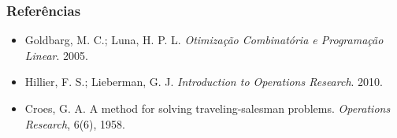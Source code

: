 \documentclass[fleqn]{beamer}
\begin{document}
\begin{frame}
	\frametitle{Referências}
	\begin{itemize}
		\item Goldbarg, M. C.; Luna, H. P. L. \textit{Otimização
			Combinatória e Programação Linear}. 2005.
		\item Hillier, F. S.; Lieberman, G. J. \textit{Introduction to
			Operations Research}. 2010.
		\item Croes, G. A. A method for solving traveling-salesman
			problems. \textit{Operations Research}, 6(6), 1958.
	\end{itemize}
\end{frame}
\end{document}
